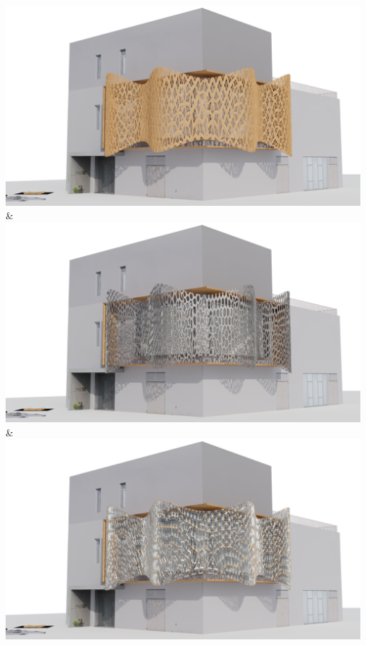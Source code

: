\documentclass[final,5p,times]{elsarticle}%
\begin{document}
\begin{linenumbers}
\begin{table}[htb]
\begin{tabularx}
                      {\includegraphics[width=1\linewidth]{Images/Pattern 1/0009}} &
                      {\includegraphics[width=1\linewidth]{Images/Pattern 2/0009}} &
                      {\includegraphics[width=1\linewidth]{Images/Pattern 3/0009}} \\
                    \bottomrule
                \end{tabularx}
            \end{table}



\end{linenumbers}
\end{document}
